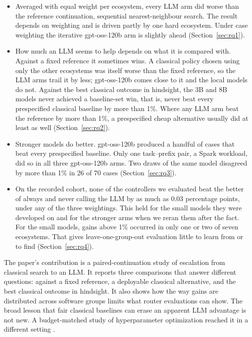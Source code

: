 \begin{itemize}
  \item Averaged with equal weight per ecosystem, every LLM arm did worse than the reference continuation, sequential nearest-neighbour search. The result depends on weighting and is driven partly by one hard ecosystem. Under case weighting the iterative gpt-oss-120b arm is slightly ahead (Section~\ref{sec:rq1}).
  \item How much an LLM seems to help depends on what it is compared with. Against a fixed reference it sometimes wins. A classical policy chosen using only the other ecosystems was itself worse than the fixed reference, so the LLM arms trail it by less; gpt-oss-120b comes close to it and the local models do not. Against the best classical outcome in hindsight, the 3B and 8B models never achieved a baseline-set win, that is, never beat every prespecified classical baseline by more than 1\%. Where any LLM arm beat the reference by more than 1\%, a prespecified cheap alternative usually did at least as well (Section~\ref{sec:rq2}).
  \item Stronger models do better. gpt-oss-120b produced a handful of cases that beat every prespecified baseline. Only one task--prefix pair, a Spark workload, did so in all three gpt-oss-120b arms. Two draws of the same model disagreed by more than 1\% in 26 of 70 cases (Section~\ref{sec:rq3}).
  \item On the recorded cohort, none of the controllers we evaluated beat the better of always and never calling the LLM by as much as 0.03 percentage points, under any of the three weightings. This held for the small models they were developed on and for the stronger arms when we reran them after the fact. For the small models, gains above 1\% occurred in only one or two of seven ecosystems. That gives leave-one-group-out evaluation little to learn from or to find (Section~\ref{sec:rq4}).
\end{itemize}

The paper's contribution is a paired-continuation study of escalation from classical search to an LLM. It reports three comparisons that answer different questions: against a fixed reference, a deployable classical alternative, and the best classical outcome in hindsight. It also shows how the way gains are distributed across software groups limits what router evaluations can show. The broad lesson that fair classical baselines can erase an apparent LLM advantage is not new. A budget-matched study of hyperparameter optimization reached it in a different setting \cite{rodrigues2026worth}.

